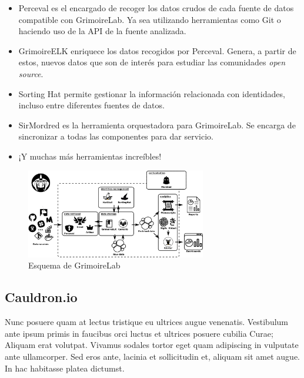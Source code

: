 \begin{itemize}
    \item Perceval es el encargado de recoger los datos crudos de cada fuente de datos compatible con GrimoireLab. Ya sea utilizando herramientas como Git o haciendo uso de la API de la fuente analizada.
    \item GrimoireELK enriquece los datos recogidos por Perceval. Genera, a partir de estos, nuevos datos que son de interés para estudiar las comunidades \emph{open source}.
    \item Sorting Hat permite gestionar la información relacionada con identidades, incluso entre diferentes fuentes de datos.
    \item SirMordred es la herramienta orquestadora para GrimoireLab. Se encarga de sincronizar a todas las componentes para dar servicio.
    \item ¡Y muchas más herramientas increíbles!
\end{itemize}

\begin{figure}[ht]
    \centering
    \includegraphics[width=0.7\textwidth]{Figures/grimoirelab-schema}
    \decoRule
    \caption[GrimoireLab (Esquema)]{Esquema de GrimoireLab \emph{\parencite{Reference12}}}
    \label{fig:grimoirelab-schema}
\end{figure}

\subsection{Cauldron.io}

Nunc posuere quam at lectus tristique eu ultrices augue venenatis. Vestibulum ante ipsum primis in faucibus orci luctus et ultrices posuere cubilia Curae; Aliquam erat volutpat. Vivamus sodales tortor eget quam adipiscing in vulputate ante ullamcorper. Sed eros ante, lacinia et sollicitudin et, aliquam sit amet augue. In hac habitasse platea dictumst.


